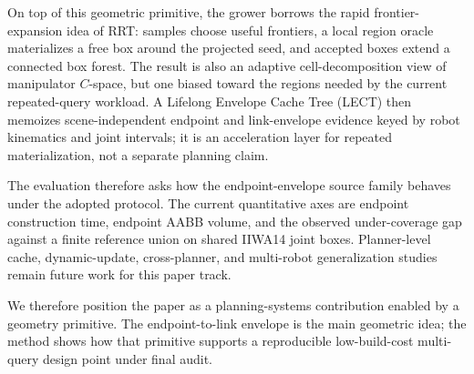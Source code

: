 \documentclass[journal]{IEEEtran}
\begin{document}
On top of this geometric primitive, the grower borrows the rapid
frontier-expansion idea of RRT: samples choose useful frontiers, a local region
oracle materializes a free box around the projected seed, and accepted boxes
extend a connected box forest. The result is also an adaptive cell-decomposition
view of manipulator $C$-space, but one biased toward the regions needed by the
current repeated-query workload. A Lifelong Envelope Cache Tree (LECT) then memoizes scene-independent endpoint
and link-envelope evidence keyed by robot kinematics and joint intervals; it is
an acceleration layer for repeated materialization, not a separate planning
claim.

The evaluation therefore asks how the endpoint-envelope source family behaves
under the adopted protocol. The current quantitative axes are endpoint
construction time, endpoint AABB volume, and the observed under-coverage gap
against a finite reference union on shared IIWA14 joint boxes. Planner-level
cache, dynamic-update, cross-planner, and multi-robot generalization studies
remain future work for this paper track.

We therefore position the paper as a planning-systems contribution enabled by a
geometry primitive. The endpoint-to-link envelope is the main geometric idea;
the method shows how that primitive supports a reproducible
low-build-cost multi-query design point under final audit.
\end{document}
